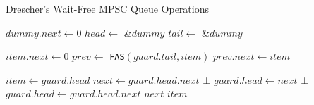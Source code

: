 \begin{algorithm}[!ht]
    \centering
    \captionsetup{justification=centering}
    \caption{Drescher's Wait-Free \ac{MPSC} Queue Operations}
    \label{alg:drescher-mpsc}
    \scriptsize
    \begin{algorithmic}[1]
        \State $dummy.next \gets 0$
        \State $head \gets$ \&$dummy$
        \State $tail \gets$ \&$dummy$
        
        \State
        
            \State $item.next \gets 0$ 
            \State $prev \gets$ \texttt{FAS}$(guard.tail, item)$ 
            \State $prev.next \gets item$ 
        \EndProcedure
        
        \State
        
            \State $item \gets guard.head$
            \State $next \gets guard.head.next$
             
                \State \Return $\bot$
            \EndIf
            \State $guard.head \gets next$
             
                \State {} 
                 
                    \State \Return $\bot$
                \EndIf
                \State $guard.head \gets guard.head.next$
                \State \Return $next$
            \EndIf
            \State \Return $item$
        \EndFunction
    \end{algorithmic}
\end{algorithm}

